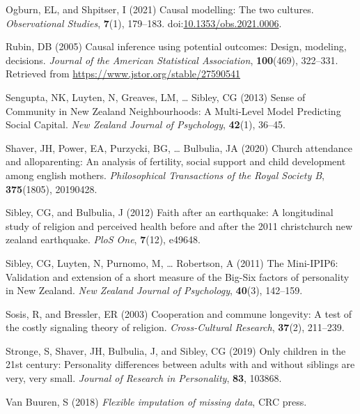 \documentclass[
  single column]{article}
\newlength{\cslhangindent}
\newenvironment{CSLReferences}[2] %
 {\begin{list}{}{%
  \setlength{\itemindent}{0pt}
  \setlength{\leftmargin}{0pt}
  \setlength{\parsep}{0pt}
  \ifodd #1
   \setlength{\leftmargin}{\cslhangindent}
   \setlength{\itemindent}{-1\cslhangindent}
  \fi
  \setlength{\itemsep}{#2\baselineskip}}}
 {\end{list}}
\begin{document}
\begin{CSLReferences}{1}{0}
Ogburn, EL, and Shpitser, I (2021) Causal modelling: The two cultures.
\emph{Observational Studies}, \textbf{7}(1), 179--183.
doi:\href{https://doi.org/10.1353/obs.2021.0006}{10.1353/obs.2021.0006}.

Rubin, DB (2005) Causal inference using potential outcomes: Design,
modeling, decisions. \emph{Journal of the American Statistical
Association}, \textbf{100}(469), 322--331. Retrieved from
\url{https://www.jstor.org/stable/27590541}

Sengupta, NK, Luyten, N, Greaves, LM, \ldots{} Sibley, CG (2013) Sense
of Community in New Zealand Neighbourhoods: A Multi-Level Model
Predicting Social Capital. \emph{New Zealand Journal of Psychology},
\textbf{42}(1), 36--45.

Shaver, JH, Power, EA, Purzycki, BG, \ldots{} Bulbulia, JA (2020) Church
attendance and alloparenting: An analysis of fertility, social support
and child development among english mothers. \emph{Philosophical
Transactions of the Royal Society B}, \textbf{375}(1805), 20190428.

Sibley, CG, and Bulbulia, J (2012) Faith after an earthquake: A
longitudinal study of religion and perceived health before and after the
2011 christchurch new zealand earthquake. \emph{PloS One},
\textbf{7}(12), e49648.

Sibley, CG, Luyten, N, Purnomo, M, \ldots{} Robertson, A (2011) The
Mini-IPIP6: Validation and extension of a short measure of the Big-Six
factors of personality in New Zealand. \emph{New Zealand Journal of
Psychology}, \textbf{40}(3), 142--159.

Sosis, R, and Bressler, ER (2003) Cooperation and commune longevity: A
test of the costly signaling theory of religion. \emph{Cross-Cultural
Research}, \textbf{37}(2), 211--239.

Stronge, S, Shaver, JH, Bulbulia, J, and Sibley, CG (2019) Only children
in the 21st century: Personality differences between adults with and
without siblings are very, very small. \emph{Journal of Research in
Personality}, \textbf{83}, 103868.

Van Buuren, S (2018) \emph{Flexible imputation of missing data}, CRC
press.


\end{CSLReferences}
\end{document}
